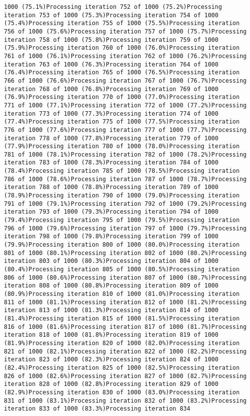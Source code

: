 \documentclass[
]{article}
\begin{document}
\begin{verbatim}
1000 (75.1%)Processing iteration 752 of 1000 (75.2%)Processing iteration 753 of 1000 (75.3%)Processing iteration 754 of 1000 (75.4%)Processing iteration 755 of 1000 (75.5%)Processing iteration 756 of 1000 (75.6%)Processing iteration 757 of 1000 (75.7%)Processing iteration 758 of 1000 (75.8%)Processing iteration 759 of 1000 (75.9%)Processing iteration 760 of 1000 (76.0%)Processing iteration 761 of 1000 (76.1%)Processing iteration 762 of 1000 (76.2%)Processing iteration 763 of 1000 (76.3%)Processing iteration 764 of 1000 (76.4%)Processing iteration 765 of 1000 (76.5%)Processing iteration 766 of 1000 (76.6%)Processing iteration 767 of 1000 (76.7%)Processing iteration 768 of 1000 (76.8%)Processing iteration 769 of 1000 (76.9%)Processing iteration 770 of 1000 (77.0%)Processing iteration 771 of 1000 (77.1%)Processing iteration 772 of 1000 (77.2%)Processing iteration 773 of 1000 (77.3%)Processing iteration 774 of 1000 (77.4%)Processing iteration 775 of 1000 (77.5%)Processing iteration 776 of 1000 (77.6%)Processing iteration 777 of 1000 (77.7%)Processing iteration 778 of 1000 (77.8%)Processing iteration 779 of 1000 (77.9%)Processing iteration 780 of 1000 (78.0%)Processing iteration 781 of 1000 (78.1%)Processing iteration 782 of 1000 (78.2%)Processing iteration 783 of 1000 (78.3%)Processing iteration 784 of 1000 (78.4%)Processing iteration 785 of 1000 (78.5%)Processing iteration 786 of 1000 (78.6%)Processing iteration 787 of 1000 (78.7%)Processing iteration 788 of 1000 (78.8%)Processing iteration 789 of 1000 (78.9%)Processing iteration 790 of 1000 (79.0%)Processing iteration 791 of 1000 (79.1%)Processing iteration 792 of 1000 (79.2%)Processing iteration 793 of 1000 (79.3%)Processing iteration 794 of 1000 (79.4%)Processing iteration 795 of 1000 (79.5%)Processing iteration 796 of 1000 (79.6%)Processing iteration 797 of 1000 (79.7%)Processing iteration 798 of 1000 (79.8%)Processing iteration 799 of 1000 (79.9%)Processing iteration 800 of 1000 (80.0%)Processing iteration 801 of 1000 (80.1%)Processing iteration 802 of 1000 (80.2%)Processing iteration 803 of 1000 (80.3%)Processing iteration 804 of 1000 (80.4%)Processing iteration 805 of 1000 (80.5%)Processing iteration 806 of 1000 (80.6%)Processing iteration 807 of 1000 (80.7%)Processing iteration 808 of 1000 (80.8%)Processing iteration 809 of 1000 (80.9%)Processing iteration 810 of 1000 (81.0%)Processing iteration 811 of 1000 (81.1%)Processing iteration 812 of 1000 (81.2%)Processing iteration 813 of 1000 (81.3%)Processing iteration 814 of 1000 (81.4%)Processing iteration 815 of 1000 (81.5%)Processing iteration 816 of 1000 (81.6%)Processing iteration 817 of 1000 (81.7%)Processing iteration 818 of 1000 (81.8%)Processing iteration 819 of 1000 (81.9%)Processing iteration 820 of 1000 (82.0%)Processing iteration 821 of 1000 (82.1%)Processing iteration 822 of 1000 (82.2%)Processing iteration 823 of 1000 (82.3%)Processing iteration 824 of 1000 (82.4%)Processing iteration 825 of 1000 (82.5%)Processing iteration 826 of 1000 (82.6%)Processing iteration 827 of 1000 (82.7%)Processing iteration 828 of 1000 (82.8%)Processing iteration 829 of 1000 (82.9%)Processing iteration 830 of 1000 (83.0%)Processing iteration 831 of 1000 (83.1%)Processing iteration 832 of 1000 (83.2%)Processing iteration 833 of 1000 (83.3%)Processing iteration 834 
\end{verbatim}
\end{document}
